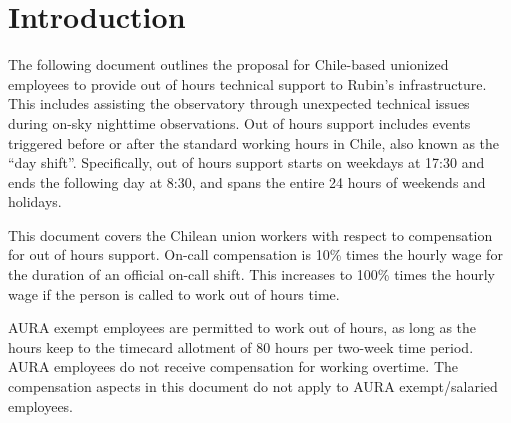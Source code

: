 \section{Introduction}

The following document outlines the proposal for Chile-based unionized employees to provide out of hours technical support to Rubin's infrastructure.
This includes assisting the observatory through unexpected technical issues during on-sky nighttime observations.
Out of hours support includes events triggered before or after the standard working hours in Chile, also known as the ``day shift''.
Specifically, out of hours support starts on weekdays at 17:30 and ends the following day at 8:30, and spans the entire 24 hours of weekends and holidays.

This document covers the Chilean union workers with respect to compensation for out of hours support.  
On-call compensation is 10\% times the hourly wage for the duration of an official on-call shift.  This increases to 100\% times the hourly wage if the person is called to work out of hours time.

AURA exempt employees are permitted to work out of hours, as long as the hours keep to the timecard allotment of 80 hours per two-week time period.  AURA employees do not receive compensation for working overtime.
The compensation aspects in this document do not apply to AURA exempt/salaried employees.
